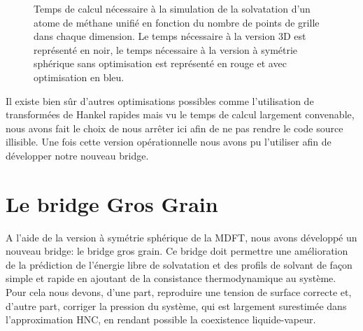 \begin{figure}[ht]
  \centering
  \caption[Temps de calcul nécessaire à la simulation de la solvatation d'un atome de méthane unifié.]{Temps de calcul nécessaire à la simulation de la solvatation d'un atome de méthane unifié en fonction du nombre de points de grille dans chaque dimension. Le temps nécessaire à la version 3D est représenté en noir, le temps nécessaire à la version à symétrie sphérique sans optimisation est représenté en rouge et avec optimisation en bleu.}
  \label{fig:temps_calcul_methane_versions}
\end{figure}

Il existe bien sûr d'autres optimisations possibles comme l'utilisation de transformées de Hankel rapides mais vu le temps de calcul largement convenable, nous avons fait le choix de nous arrêter ici afin de ne pas rendre le code source illisible. Une fois cette version opérationnelle nous avons pu l'utiliser afin de développer notre nouveau bridge.



\section{Le bridge Gros Grain}
A l'aide de la version à symétrie sphérique de la MDFT, nous avons développé un nouveau bridge: le bridge gros grain. Ce bridge doit permettre une amélioration de la prédiction de l'énergie libre de solvatation et des profils de solvant de façon simple et rapide en ajoutant de la consistance thermodynamique au système. Pour cela nous devons, d'une part, reproduire une tension de surface correcte et, d'autre part, corriger la pression du système, qui est largement surestimée dans l'approximation HNC, en rendant possible la coexistence liquide-vapeur. 

